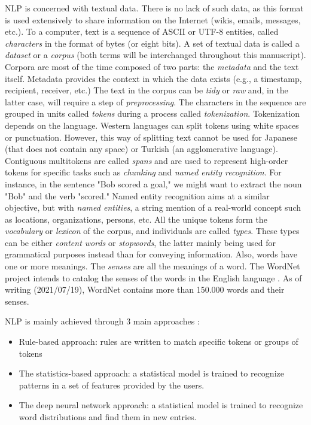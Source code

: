 NLP is concerned with textual data.
There is no lack of such data, as this format is used extensively to share information on the Internet (wikis, emails, messages, etc.).
To a computer, text is a sequence of ASCII or UTF-8 entities, called \emph{characters} in the format of bytes (or eight bits).
A set of textual data is called a \emph{dataset} or a \emph{corpus} (both terms will be interchanged throughout this manuscript).
Corpora are most of the time composed of two parts: the \emph{metadata} and the text itself.
Metadata provides the context in which the data exists (e.g., a timestamp, recipient, receiver, etc.)
The text in the corpus can be \emph{tidy} or \emph{raw} and, in the latter case, will require a step of \emph{preprocessing}.
The characters in the sequence are grouped in units called \emph{tokens} during a process called \emph{tokenization}.
Tokenization depends on the language.
Western languages can split tokens using white spaces or punctuation.
However, this way of splitting text cannot be used for Japanese (that does not contain any space) or Turkish (an agglomerative language).
Contiguous multitokens are called \emph{spans} and are used to represent high-order tokens for specific tasks such as \emph{chunking} and \emph{named entity recognition}.
For instance, in the sentence "Bob scored a goal," we might want to extract the noun "Bob" and the verb "scored."
Named entity recognition aims at a similar objective, but with \emph{named entities}, a string mention of a real-world concept such as locations, organizations, persons, etc.
All the unique tokens form the \emph{vocabulary} or \emph{lexicon} of the corpus, and individuals are called \emph{types}.
These types can be either \emph{content words} or \emph{stopwords}, the latter mainly being used for grammatical purposes instead than for conveying information.
Also, words have one or more meanings.
The \emph{senses} are all the meanings of a word.
The WordNet project intends to catalog the senses of the words in the English language \parencite{millerWordNetLexicalDatabase1995}.
As of writing (2021/07/19), WordNet contains more than 150.000 words and their senses.

NLP is mainly achieved through 3 main approaches \parencite{hirschbergAdvancesNaturalLanguage2015}:

\begin{itemize}
    \item Rule-based approach: rules are written to match specific tokens or groups of tokens
    \item The statistics-based approach: a statistical model is trained to recognize patterns in a set of features provided by the users.
    \item The deep neural network approach: a statistical model is trained to recognize word distributions and find them in new entries.
\end{itemize}

